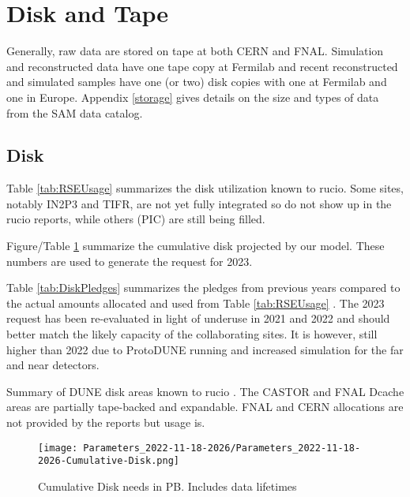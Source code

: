 \documentclass[12pt]{article}
\begin{document}
\section{Disk and Tape}

Generally, raw data are stored on tape at both CERN and FNAL.  Simulation and reconstructed data  have one tape copy at Fermilab and recent reconstructed and simulated samples have one (or two) disk copies with one at Fermilab and one in Europe.  Appendix \ref{storage} gives details on the size and types of data from the SAM data catalog.

\subsection{Disk}
Table \ref{tab:RSEUsage} summarizes the disk utilization known to rucio.  Some sites, notably IN2P3 and TIFR, are not yet fully integrated so do not show up in the rucio reports, while others (PIC) are still being filled.

Figure/Table  \ref{fig:Cumulative-Disk}  summarize the cumulative disk projected by our model. These numbers are used to generate the request for 2023. 

Table \ref{tab:DiskPledges} summarizes the pledges from previous years compared to the actual amounts allocated and used from Table \ref{tab:RSEUsage} .   The 2023 request has been re-evaluated in light of underuse in 2021 and 2022 and should better match the likely capacity of the collaborating sites.  It is however, still higher than 2022 due to ProtoDUNE running and increased simulation for the far and near detectors. 

\begin{table}[ht]
\centering{}
\caption{Summary  of DUNE disk areas known to rucio \cite{scotgrid}.  The CASTOR and FNAL Dcache areas are partially tape-backed and expandable. FNAL and CERN allocations are not provided by the reports but usage is.  }
\label{tab:RSEUsage}
\end{table}

\begin{figure}[h]
\centering\texttt{[image: Parameters\_2022-11-18-2026/Parameters\_2022-11-18-2026-Cumulative-Disk.png]}

\caption{Cumulative Disk needs in PB. Includes data lifetimes}\label{fig:Cumulative-Disk}
\end{figure}
\end{document}
